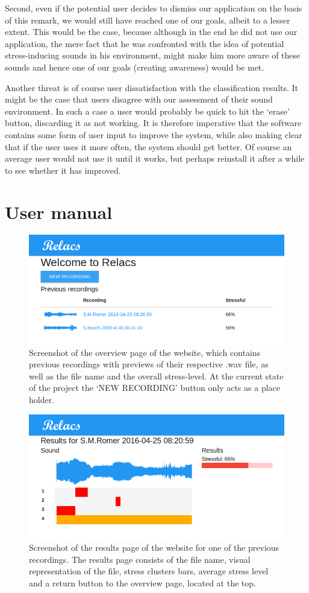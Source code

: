 \documentclass[a4paper]{article}
\begin{document}
Second, even if the potential user decides to dismiss our application on the basis of this remark, we would still have reached one of our goals, albeit to a lesser extent.
This would be the case, because although in the end he did not use our application,
the mere fact that he was confronted with the idea of potential stress-inducing sounds in his environment, might make him more aware of these sounds and hence one of our goals (creating awareness) would be met.

Another threat is of course user dissatisfaction with the classification results.
It might be the case that users disagree with our assessment of their sound environment.
In such a case a user would probably be quick to hit the `erase' button, discarding it as not working.
It is therefore imperative that the software contains some form of user input to improve the system, while also making clear that if the user uses it more often, the system should get better.
Of course an average user would not use it until it works, but perhaps reinstall it after a while to see whether it has improved.

\section{User manual}
\begin{figure}[t]
\centering
\includegraphics[width=0.7\linewidth]{./Website}
\caption{Screenshot of the overview page of the website, which contains previous recordings with previews of their respective .wav file, as well as the file name and the overall stress-level. At the current state of the project the `NEW RECORDING' button only acts as a place holder.}
\label{fig:Website}
\end{figure}

\begin{figure}[t]
\centering
\includegraphics[width=0.7\linewidth]{./Audio1Results}
\caption{Screenshot of the results page of the website for one of the previous recordings. The results page consists of the file name, visual representation of the file, stress clusters bars, average stress level and a return button to the overview page, located at the top.}
\label{fig:Audio1}
\end{figure}
\end{document}
